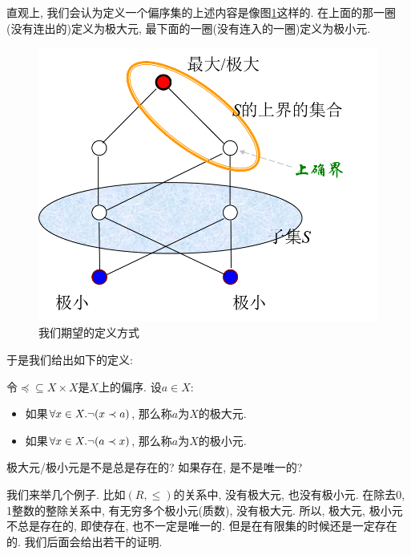 直观上, 我们会认为定义一个偏序集的上述内容是像图\ref{figs:part-ord}这样的. 在上面的那一圈(没有连出的)定义为极大元, 最下面的一圈(没有连入的一圈)定义为极小元. 

\begin{figure}
	\centering
	\includegraphics[scale=0.6]{3-set-theory/figs/part-ord}
	\caption{我们期望的定义方式}
	\label{figs:part-ord}
\end{figure}

于是我们给出如下的定义: 

\begin{definition}
	令$\preceq\subseteq X \times X$是$X$上的偏序. 设$a\in X$: 
	\begin{itemize}
		\item 如果$\forall x\in X. \lnot (x\prec a)$, 那么称$a$为$X$的极大元. 
		\item 如果$\forall x\in X. \lnot (a\prec x)$, 那么称$a$为$X$的极小元.
	\end{itemize} 
\end{definition}

\begin{bonus}
	极大元/极小元是不是总是存在的? 如果存在, 是不是唯一的? 
\end{bonus}

我们来举几个例子. 比如$(R,\leq)$的关系中, 没有极大元, 也没有极小元. 在除去0, 1整数的整除关系中, 有无穷多个极小元(质数), 没有极大元. 所以, 极大元, 极小元不总是存在的, 即使存在, 也不一定是唯一的. 但是在有限集的时候还是一定存在的. 我们后面会给出若干的证明. 

